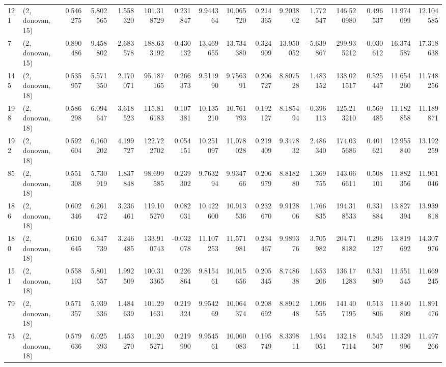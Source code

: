 \begin{tabular}{llrrrrrrrrrrrrrr}
121 &  (2, donovan, 15) &   0.546275 &   5.802565 &   1.558320 &   101.318729 &   0.231847 &   9.944364 &  10.065720 &  0.214365 &   9.203802 &   1.772547 &   146.520980 &  0.496537 &  11.974099 &  12.104585 \\
7   &  (2, donovan, 15) &   0.890486 &   9.458802 &  -2.683578 &   188.633192 &  -0.430132 &  13.469655 &  13.734380 &  0.324909 &  13.950052 &  -5.639867 &   299.935212 & -0.030612 &  16.374587 &  17.318638 \\
145 &  (2, donovan, 18) &   0.535957 &   5.571350 &   2.170071 &    95.187165 &   0.266373 &   9.511990 &   9.756391 &  0.206727 &   8.807528 &   1.483152 &   138.021517 &  0.525447 &  11.654260 &  11.748256 \\
198 &  (2, donovan, 18) &   0.586298 &   6.094647 &   3.618523 &   115.816183 &   0.107381 &  10.135210 &  10.761793 &  0.192127 &   8.185494 &  -0.396113 &   125.213210 &  0.569485 &  11.182858 &  11.189871 \\
192 &  (2, donovan, 18) &   0.592604 &   6.160202 &   4.199727 &   122.722702 &   0.054151 &  10.251097 &  11.078028 &  0.219409 &   9.347832 &   2.486340 &   174.035686 &  0.401621 &  12.955840 &  13.192259 \\
85  &  (2, donovan, 18) &   0.551308 &   5.730919 &   1.837848 &    98.699585 &   0.239302 &   9.763294 &   9.934766 &  0.206979 &   8.818280 &   1.369755 &   143.066611 &  0.508101 &  11.882356 &  11.961046 \\
186 &  (2, donovan, 18) &   0.602346 &   6.261472 &   3.236461 &   119.105270 &   0.082031 &  10.422600 &  10.913536 &  0.232670 &   9.912806 &   1.766835 &   194.318533 &  0.331884 &  13.827394 &  13.939818 \\
180 &  (2, donovan, 18) &   0.610645 &   6.347739 &   3.246485 &   133.910743 &  -0.032078 &  11.107253 &  11.571981 &  0.234467 &   9.989376 &   3.705982 &   204.718182 &  0.296127 &  13.819692 &  14.307976 \\
151 &  (2, donovan, 18) &   0.558103 &   5.801557 &   1.992509 &   100.313365 &   0.226864 &   9.815461 &  10.015656 &  0.205345 &   8.748638 &   1.653206 &   136.171283 &  0.531809 &  11.551545 &  11.669245 \\
79  &  (2, donovan, 18) &   0.571357 &   5.939336 &   1.484639 &   101.291631 &   0.219324 &   9.954269 &  10.064374 &  0.208692 &   8.891248 &   1.096555 &   141.407195 &  0.513806 &  11.840809 &  11.891476 \\
73  &  (2, donovan, 18) &   0.579636 &   6.025393 &   1.453270 &   101.205271 &   0.219990 &   9.954561 &  10.060083 &  0.195749 &   8.339811 &   1.954051 &   132.187114 &  0.545507 &  11.329996 &  11.497266 \\

\end{tabular}
